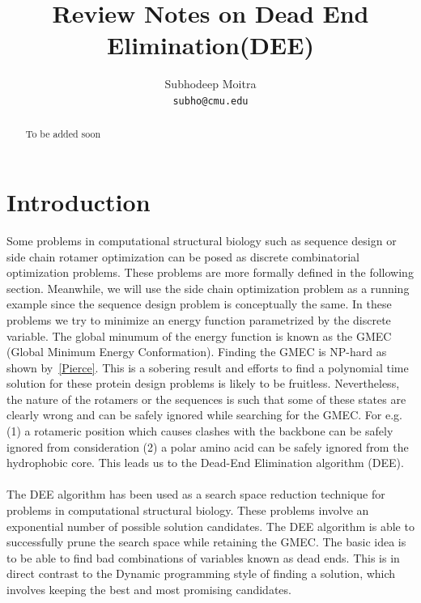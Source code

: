 \documentclass{article}
\begin{document}
\title{Review Notes on Dead End Elimination(DEE)}

\author{Subhodeep Moitra \\ {\tt subho@cmu.edu}}

\maketitle

\begin{abstract}
To be added soon
\end{abstract}

\section{Introduction}
Some problems in computational structural biology such as sequence design or side chain rotamer optimization can be posed as discrete combinatorial optimization problems. These problems are more formally defined in the following section. Meanwhile, we will use the side chain optimization problem as a running example since the sequence design problem is conceptually the same.  In these problems we try to minimize an energy function parametrized by the discrete variable. The global minumum of the energy function is known as the GMEC (Global Minimum Energy Conformation). Finding the GMEC is NP-hard as shown by~\ref{Pierce}. This is a sobering result and efforts to find a polynomial time solution for these protein design problems is likely to be fruitless. Nevertheless, the nature of the rotamers or the sequences is such that some of these states are clearly wrong and can be safely ignored while searching for the GMEC. For e.g.(1) a rotameric position which causes clashes with the backbone can be safely ignored from consideration (2) a polar amino acid can be safely ignored from the hydrophobic core. This leads us to the Dead-End Elimination algorithm (DEE). 
\\
\\
The DEE algorithm has been used as a search space reduction technique for problems in computational structural biology. These problems involve an exponential number of possible solution candidates. The DEE algorithm is able to successfully prune the search space while retaining the GMEC. The basic idea  is to be able to find bad combinations of variables known as dead ends. This is in direct contrast to the Dynamic programming style of finding a solution, which involves keeping the best and most promising candidates. 
\\
\end{document}
